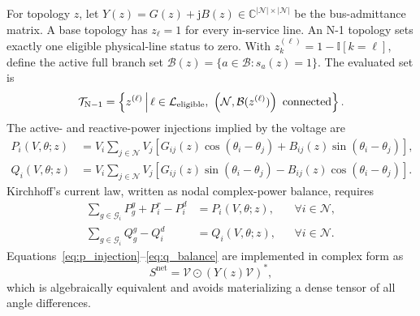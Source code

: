 \documentclass[final,5p,times,twocolumn]{elsarticle}
\newcommand{\C}{\mathbb{C}}
\newcommand{\Nset}{\mathcal{N}}
\newcommand{\Lset}{\mathcal{L}}
\newcommand{\Bset}{\mathcal{B}}
\newcommand{\Gset}{\mathcal{G}}
\newcommand{\Tset}{\mathcal{T}}
\begin{document}
For topology $z$, let
$Y(z)=G(z)+\mathrm{j}B(z)\in\C^{|\Nset|\times|\Nset|}$ be the bus-admittance
matrix. A base topology has $z_\ell=1$ for every in-service line. An N-1
topology sets exactly one eligible physical-line status to zero. With
$z_k^{(\ell)}=1-\mathbb{I}[k=\ell]$, define the active full branch set
$\Bset(z)=\{a\in\Bset:s_a(z)=1\}$. The evaluated set is
\begin{equation}
  \Tset_{\mathrm{N-1}}
  =
  \left\{
    z^{(\ell)}
    \,\middle|\,
    \ell\in\Lset_{\mathrm{eligible}},\
    \left(\Nset,\Bset(z^{(\ell)})\right)\ {\rm connected}
  \right\}.
  \label{eq:nminusone}
\end{equation}
The active- and reactive-power injections implied by the voltage are
\begin{align}
  P_i(V,\theta;z)
  &=
  V_i\sum_{j\in\Nset}V_j
  \left[
    G_{ij}(z)\cos(\theta_i-\theta_j)
    +B_{ij}(z)\sin(\theta_i-\theta_j)
  \right],
  \label{eq:p_injection}\\
  Q_i(V,\theta;z)
  &=
  V_i\sum_{j\in\Nset}V_j
  \left[
    G_{ij}(z)\sin(\theta_i-\theta_j)
    -B_{ij}(z)\cos(\theta_i-\theta_j)
  \right].
  \label{eq:q_injection}
\end{align}
Kirchhoff's current law, written as nodal complex-power balance, requires
\begin{align}
  \sum_{g\in\Gset_i}P_g^g + P_i^r-P_i^d
  &=P_i(V,\theta;z),
  &&\forall i\in\Nset,
  \label{eq:p_balance}\\
  \sum_{g\in\Gset_i}Q_g^g-Q_i^d
  &=Q_i(V,\theta;z),
  &&\forall i\in\Nset.
  \label{eq:q_balance}
\end{align}
Equations~\eqref{eq:p_injection}--\eqref{eq:q_balance} are implemented in
complex form as
\begin{equation}
  S^{\mathrm{net}}
  =
  \mathcal{V}\odot\left(Y(z)\mathcal{V}\right)^*,
  \label{eq:complex_power}
\end{equation}
which is algebraically equivalent and avoids materializing a dense tensor of
all angle differences.
\end{document}

